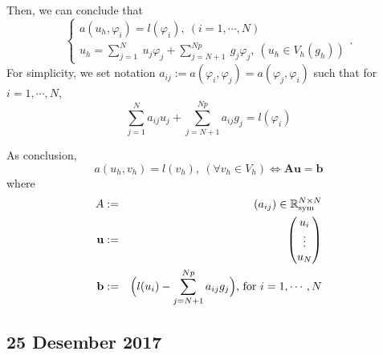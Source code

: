 \documentclass[a4paper,10pt]{article}
\begin{document}
Then, we can conclude that
\begin{equation*} 
\begin{cases}
a(u_h, \varphi_i) = l(\varphi_i), \ (i=1, \cdots , N)\\
u_h = \sum_{j=1}^{N} \ u_j \varphi_j + \sum_{j=N+1}^{Np} \ g_j \varphi_j, \ (u_h \in V_h (g_h))
\end{cases}.
\end{equation*}
For simplicity, we set notation $ a_{ij} := a(\varphi_i, \varphi_j) = a(\varphi_j, \varphi_i)$ such that for $  i=1, \cdots , N $,
\[\sum_{j=1}^{N} a_{ij} u_{j} + \sum_{j=N+1}^{Np} a_{ij} g_j = l(\varphi_i)\]

As conclusion, 
\[ a(u_h , v_h)=l(v_h), \ (\forall v_h \in V_h) \Leftrightarrow \mathbf{A} \mathbf{u} = \mathbf{b} \]
where
\begin{eqnarray}\nonumber
A &:=& (a_{ij}) \in \mathbb{R}_{\text{sym}}^{N \times N}\\ \nonumber
\text{\textbf{u}} &:=& \begin{pmatrix}
u_i \\ \vdots \\ u_{N}
\end{pmatrix}\\ \nonumber
\text{\textbf{b}} &:=& \Big(l(u_i) - \sum_{j=N+1}^{Np} a_{ij} g_j\Big) \text{, for }{i=1, \cdots , N}
\end{eqnarray}


\subsection{25 Desember 2017}
\end{document}
